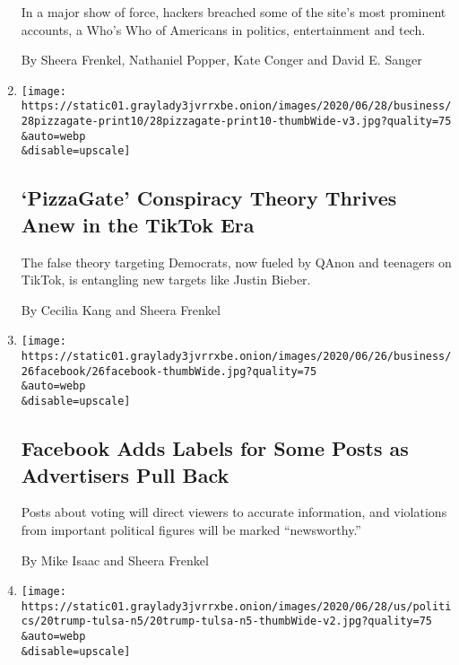 \begin{enumerate}
  In a major show of force, hackers breached some of the site's most
  prominent accounts, a Who's Who of Americans in politics,
  entertainment and tech.

  By Sheera Frenkel, Nathaniel Popper, Kate Conger and David E. Sanger
\item
  \href{/2020/06/27/technology/pizzagate-justin-bieber-qanon-tiktok.html}{}

  \texttt{[image: https://static01.graylady3jvrrxbe.onion/images/2020/06/28/business/28pizzagate-print10/28pizzagate-print10-thumbWide-v3.jpg?quality=75\\\&auto=webp\\\&disable=upscale]}

  \hypertarget{pizzagate-conspiracy-theory-thrives-anew-in-the-tiktok-era}{%
  \subsection{`PizzaGate' Conspiracy Theory Thrives Anew in the TikTok
  Era}\label{pizzagate-conspiracy-theory-thrives-anew-in-the-tiktok-era}}

  The false theory targeting Democrats, now fueled by QAnon and
  teenagers on TikTok, is entangling new targets like Justin Bieber.

  By Cecilia Kang and Sheera Frenkel
\item
  \href{/2020/06/26/technology/facebook-labels-advertisers.html}{}

  \texttt{[image: https://static01.graylady3jvrrxbe.onion/images/2020/06/26/business/26facebook/26facebook-thumbWide.jpg?quality=75\\\&auto=webp\\\&disable=upscale]}

  \hypertarget{facebook-adds-labels-for-some-posts-as-advertisers-pull-back}{%
  \subsection{Facebook Adds Labels for Some Posts as Advertisers Pull
  Back}\label{facebook-adds-labels-for-some-posts-as-advertisers-pull-back}}

  Posts about voting will direct viewers to accurate information, and
  violations from important political figures will be marked
  ``newsworthy.''

  By Mike Isaac and Sheera Frenkel
\item
  \href{/2020/06/21/style/tiktok-trump-rally-tulsa.html}{}

  \texttt{[image: https://static01.graylady3jvrrxbe.onion/images/2020/06/28/us/politics/20trump-tulsa-n5/20trump-tulsa-n5-thumbWide-v2.jpg?quality=75\\\&auto=webp\\\&disable=upscale]}


\end{enumerate}
